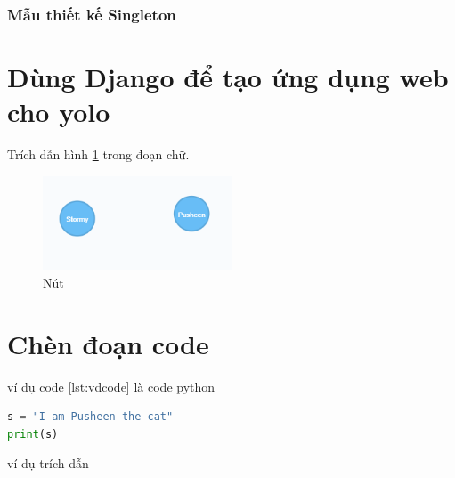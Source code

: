 \subsubsection{Mẫu thiết kế Singleton}

\section{Dùng Django để tạo ứng dụng web cho yolo}





Trích dẫn hình \ref{fig:node} trong đoạn chữ. 

\begin{figure}[h]
\centering
\includegraphics[width=0.5\textwidth]{image/node.PNG}
\caption{\label{fig:node} Nút}
\end{figure}


\section{Chèn đoạn code}


ví dụ code \ref{lst:vdcode} là code python 


\begin{lstlisting}[caption={Đoạn code}, label={lst:vdcode}, language=python]
s = "I am Pusheen the cat"
print(s)
\end{lstlisting}

ví dụ trích dẫn \cite{robinson2013graph}










